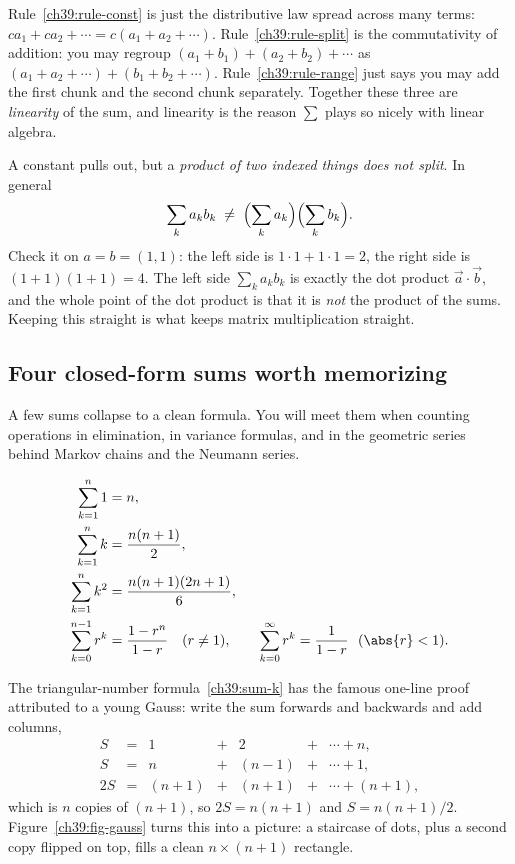 Rule~\eqref{ch39:rule-const} is just the distributive law spread across many terms:
$ca_1 + ca_2 + \cdots = c(a_1 + a_2 + \cdots)$. Rule~\eqref{ch39:rule-split} is the commutativity of
addition: you may regroup $(a_1+b_1) + (a_2+b_2) + \cdots$ as $(a_1 + a_2 + \cdots) + (b_1 + b_2 +
\cdots)$. Rule~\eqref{ch39:rule-range} just says you may add the first chunk and the second chunk
separately. Together these three are \emph{linearity} of the sum, and linearity is the reason
$\sum$ plays so nicely with linear algebra.

\begin{trapbox}
A constant pulls out, but a \emph{product of two indexed things does not split}. In general
\[
\sum_k a_k b_k \;\ne\; \Bigl(\sum_k a_k\Bigr)\Bigl(\sum_k b_k\Bigr).
\]
Check it on $a = b = (1,1)$: the left side is $1\cdot1 + 1\cdot1 = 2$, the right side is
$(1+1)(1+1) = 4$. The left side $\sum_k a_k b_k$ is exactly the dot product $\vec{a}\cdot\vec{b}$,
and the whole point of the dot product is that it is \emph{not} the product of the sums. Keeping this
straight is what keeps matrix multiplication straight.
\end{trapbox}

\subsection{Four closed-form sums worth memorizing}
\label{ch39:closed-forms}

A few sums collapse to a clean formula. You will meet them when counting operations in elimination,
in variance formulas, and in the geometric series behind Markov chains and the Neumann series.

\begin{formalbox}
\begin{align}
\sum_{k=1}^{n} 1 &= n, \label{ch39:sum-ones}\\
\sum_{k=1}^{n} k &= \frac{n(n+1)}{2}, \label{ch39:sum-k}\\
\sum_{k=1}^{n} k^2 &= \frac{n(n+1)(2n+1)}{6}, \label{ch39:sum-ksq}\\
\sum_{k=0}^{n-1} r^k &= \frac{1 - r^n}{1 - r}\quad (r \ne 1), \qquad
\sum_{k=0}^{\infty} r^k = \frac{1}{1-r}\ \ (\abs{r}<1). \label{ch39:geometric}
\end{align}
\end{formalbox}

The triangular-number formula~\eqref{ch39:sum-k} has the famous one-line proof attributed to a young
Gauss: write the sum forwards and backwards and add columns,
\[
\begin{array}{rcccccc}
S &=& 1 &+& 2 &+& \cdots + n,\\
S &=& n &+& (n{-}1) &+& \cdots + 1,\\ \hline
2S &=& (n{+}1) &+& (n{+}1) &+& \cdots + (n{+}1),
\end{array}
\]
which is $n$ copies of $(n+1)$, so $2S = n(n+1)$ and $S = n(n+1)/2$. Figure~\ref{ch39:fig-gauss}
turns this into a picture: a staircase of dots, plus a second copy flipped on top, fills a clean
$n \times (n+1)$ rectangle.

